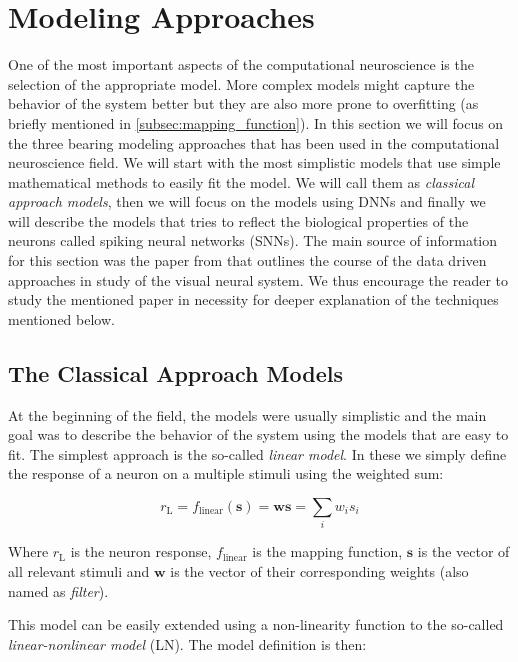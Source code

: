 \section{Modeling Approaches}
\label{sec:modeling_approaches}
One of the most important aspects of the computational neuroscience is the selection
of the appropriate model. More complex models might capture the behavior of the system
better but they are also more prone to overfitting (as briefly mentioned in 
\ref{subsec:mapping_function}). In this section we will focus on the three bearing 
modeling approaches that has been used in the computational neuroscience field. We 
will start with the most simplistic models that use simple mathematical methods to easily fit the model. We will call them as \emph{classical approach models},
then we will focus on the models using DNNs and finally we will describe the 
models that tries to reflect the biological properties of the neurons called 
spiking neural networks (SNNs). The main source of information for this section was the paper from \citet{annurev:/content/journals/10.1146/annurev-vision-091718-014731} that outlines the course of the data driven approaches in study of the visual neural system. We thus encourage the reader to study the mentioned paper in necessity for deeper explanation of the techniques mentioned below.

\subsection{The Classical Approach Models}
\label{subsec:classical_approach}
At the beginning of the field, the models were usually
simplistic and the main goal was to describe the behavior of the system using the models
that are easy to fit. The simplest approach is the so-called \emph{linear model}. In these we simply define the response of a neuron on a multiple stimuli using the weighted sum:

$$r_{\text{L}} = f_{\text{linear}}(\boldsymbol{s}) = \boldsymbol{w}\boldsymbol{s} = \sum_{i} w_i s_i$$

Where $r_{\text{L}}$ is the neuron response, $f_{\text{linear}}$ is the mapping function, 
$\boldsymbol{s}$ is the vector of all relevant stimuli and $\boldsymbol{w}$ is the
vector of their corresponding weights (also named as \emph{filter}).

This model can be easily extended using a non-linearity function to the 
so-called \emph{linear-nonlinear model} (LN). The model definition is then:

